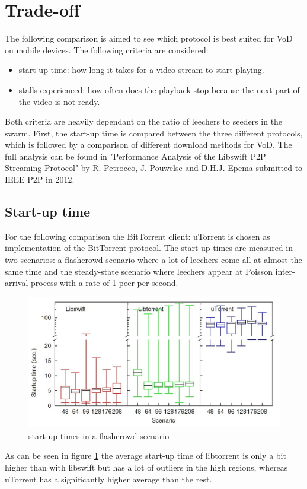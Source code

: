 \section{Trade-off}
The following comparison is aimed to see which protocol is best suited for VoD on mobile devices. The following criteria are considered:
\begin{itemize}
	\item start-up time: how long it takes for a video stream to start playing.
	\item stalls experienced: how often does the playback stop because the next part of the video is not ready.
\end{itemize}
Both criteria are heavily dependant on the ratio of leechers to seeders in the swarm. First, the start-up time is compared between the three different protocols, which is followed by a comparison of different download methods for VoD. The full analysis can be found in "Performance Analysis of the Libswift P2P Streaming Protocol" by R. Petrocco, J. Pouwelse and D.H.J. Epema submitted to IEEE P2P in 2012.

\subsection{Start-up time}
For the following comparison the BitTorrent client: uTorrent is chosen as implementation of the BitTorrent protocol. The start-up times are measured in two scenarios: a flashcrowd scenario where a lot of leechers come all at almost the same time and the steady-state scenario where leechers appear at Poisson inter-arrival process with a rate of 1 peer per second.
\begin{figure}[H]
	\centering
	\includegraphics[scale=0.35]{P2P_streaming_protocol/images/start_flashcrowd.jpg}
	\caption{start-up times in a flashcrowd scenario}
	\label{fig:start_flash}
\end{figure}
As can be seen in figure \ref{fig:start_flash} the average start-up time of libtorrent is only a bit higher than with libswift but has a lot of outliers in the high regions, whereas uTorrent has a significantly higher average than the rest.

